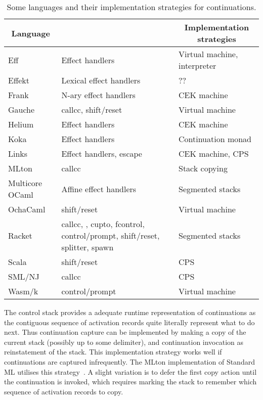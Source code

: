 \documentclass[12pt,phd,lfcs,twoside,openright,logo,leftchapter,normalheadings]{infthesis}
\theoremstyle{plain}
\theoremstyle{definition}
\begin{document}
\begin{table}
  \centering
  \begin{tabular}{| l | >{\raggedright}p{4.3cm} | l |}
    \hline
    \multicolumn{1}{|c|}{\textbf{Language}} & \multicolumn{1}{c |}{\textbf{Control operators}} & \multicolumn{1}{c|}{\textbf{Implementation strategies}}\\
    \hline
    Eff      & Effect handlers & Virtual machine, interpreter \\
    \hline
    Effekt   & Lexical effect handlers & ??\\
    \hline
    Frank    & N-ary effect handlers & CEK machine \\
    \hline
    Gauche   & callcc, shift/reset & Virtual machine \\
    \hline
    Helium   & Effect handlers & CEK machine \\
    \hline
    Koka     & Effect handlers & Continuation monad\\
    \hline
    Links    & Effect handlers, escape & CEK machine, CPS\\
    \hline
    MLton    & callcc & Stack copying\\
    \hline
    Multicore OCaml  & Affine effect handlers & Segmented stacks\\
    \hline
    OchaCaml & shift/reset & Virtual machine\\
    \hline
    Racket & callcc, \textCallcomc{}, cupto, fcontrol, control/prompt, shift/reset, splitter, spawn & Segmented stacks\\
    \hline
    Scala                 & shift/reset       & CPS\\
    \hline
    SML/NJ                & callcc            & CPS\\
    \hline
    Wasm/k                & control/prompt    & Virtual machine \\
    \hline
  \end{tabular}
  \caption{Some languages and their implementation strategies for continuations.}\label{tbl:ctrl-operators-impls}
\end{table}
%
The control stack provides a adequate runtime representation of
continuations as the contiguous sequence of activation records quite
literally represent what to do next.
%
Thus continuation capture can be implemented by making a copy of the
current stack (possibly up to some delimiter), and continuation
invocation as reinstatement of the stack. This implementation strategy
works well if continuations are captured infrequently. The MLton
implementation of Standard ML utilises this strategy~\cite{Fluet20}.
A slight variation is to defer the first copy action until the
continuation is invoked, which requires marking the stack to remember
which sequence of activation records to copy.
\end{document}
